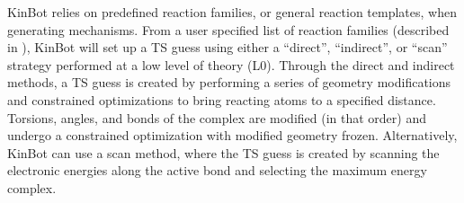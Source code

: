 \documentclass[preprint, 11pt]{elsarticle} %
\begin{document}

KinBot relies on predefined reaction families, or general reaction templates, when generating mechanisms. 
From a user specified list of reaction families (described in \cite{kinbot:2019}), KinBot will set up a TS guess using either a ``direct'', ``indirect'', or ``scan'' strategy performed at a low level of theory (L0).
Through the direct and indirect methods, a TS guess is created by performing a series of geometry modifications and constrained optimizations to bring reacting atoms to a specified distance. 
Torsions, angles, and bonds of the complex are modified (in that order) and undergo a constrained optimization with modified geometry frozen.
Alternatively, KinBot can use a scan method, where the TS guess is created by scanning the electronic energies along the active bond and selecting the maximum energy complex.
\end{document}
